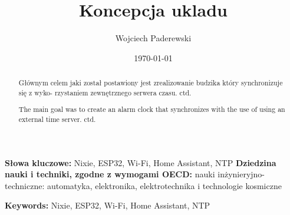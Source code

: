 \documentclass[../main.tex]{subfiles}
\author{Wojciech Paderewski}
\date{\today}
\title{Koncepcja ukladu}
\begin{document}
\begin{abstract}
  Głównym celem jaki został postawiony jest zrealizowanie budzika który synchronizuje się z wyko-
  rzystaniem zewnętrznego serwera czasu. ctd.
\end{abstract}
\textbf{Słowa kluczowe:} Nixie, ESP32, Wi-Fi, Home Assistant, NTP
\textbf{Dziedzina nauki i techniki, zgodne z wymogami OECD:} nauki inżynieryjno-techniczne: automatyka, elektronika, elektrotechnika i technologie kosmiczne
\newpage
{}
\begin{abstract}
  The main goal was to create an alarm clock that synchronizes with the use of
  using an external time server. ctd.
\end{abstract}
\textbf{Keywords:} Nixie, ESP32, Wi-Fi, Home Assistant, NTP
\end{document}
